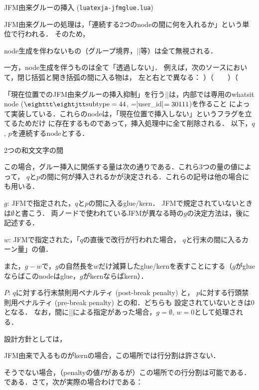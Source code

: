 \beginsection JFM由来グルーの挿入 ({\tt luatexja-jfmglue.lua})

JFM由来グルーの処理は，「連続する2つのnodeの間に何を入れるか」という単位で行われる．
そのため，
\item node生成を伴わないもの（グループ境界，|\relax|等）は全て無視される．
\item 一方，node生成を伴うものは全て「透過しない」．
例えば，次のソースにおいて，閉じ括弧と開き括弧の間に入る物は，
左と右とで異なる：
\begintt
）（　　）\hbox{}（
\endtt
\item 「現在位置でのJFM由来グルーの挿入抑制」を行う|\inhibitglue|は，内部では専用のwhatsit node 
($\hbox{\tt subtype}=44$, =\hbox{|user_id|}$\copy0=30111$)を作ること
によって実装している．これらのnodeは，「現在位置で挿入しない」というフラグを立てるためだけ
に存在するものであって，挿入処理中に全て削除される．
\enditem
以下，$q$, $p$を連続するnodeとする．

\beginparagraph 2つの和文文字の間

この場合，グルー挿入に関係する量は次の通りである．これら3つの量の値によって，
$q$と$p$の間に何が挿入されるかが決定される．これらの記号は他の場合にも用いる．
\item $g$: JFMで指定された，$q$と$p$の間に入るglue/kern．
JFMで規定されていないときは$\emptyset$と書こう．
両ノードで使われているJFMが異なる時の$g$の決定方法は，後に記述する．
\item $w$: JFMで指定された，「$q$の直後で改行が行われた場合，
$q$と行末の間に入るカーン量」の値．

また，$g-w$で，$g$の自然長を$w$だけ減算したglue/kernを表すことにする（$g$がglueならばこのnodeはglue，$g$がkernならばkern）．

\item $P$: $q$に対する行末禁則用ペナルティ (post-break penalty) と，
$p$に対する行頭禁則用ペナルティ (pre-break penalty) との和．どちらも
設定されていないときは0となる．
\enditem
なお，間に|\inhibitglue|による指定があった場合，$g=\emptyset$, $w=0$として処理される．

設計方針としては，
\item JFM由来で入るものがkernの場合，この場所では行分割は許さない．
\item そうでない場合，（penaltyの値$P$があるが）この場所での行分割は可能である．
\enditem
である．さて，次が実際の場合わけである：

